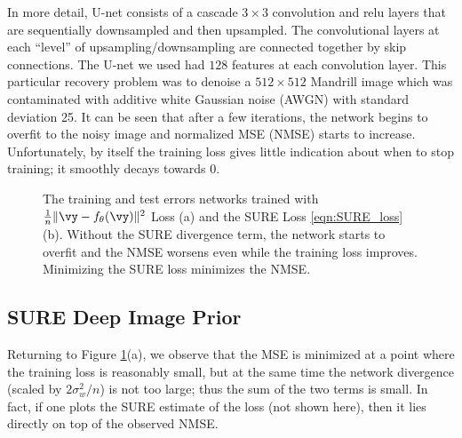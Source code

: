 \documentclass{article}
\begin{document}
In more detail, U-net \cite{Unet} consists of a cascade $3\times 3$ convolution and relu layers that are sequentially downsampled and then upsampled. The convolutional layers at each ``level'' of upsampling/downsampling are connected together by skip connections. The U-net we used had $128$ features at each convolution layer.
This particular recovery problem was to denoise a $512\times 512$ Mandrill image which was contaminated with additive white Gaussian noise (AWGN) with standard deviation 25.
It can be seen that after a few iterations, the network begins to overfit to the noisy image and normalized MSE (NMSE) starts to increase. 
Unfortunately, by itself the training loss gives little indication about when to stop training; it smoothly decays towards $0$.

\begin{figure}[t]
\centering
{}
\caption{ The training and test errors networks trained with $\frac{1}{n}\|\vy-f_\theta(\vy)\|^2$ Loss (a) and the SURE Loss \eqref{eqn:SURE_loss} (b). Without the SURE divergence term, the network starts to overfit and the NMSE worsens even while the training loss improves. Minimizing the SURE loss minimizes the NMSE.}
\label{fig:ReconErrs}
\end{figure}\subsection{SURE Deep Image Prior}

Returning to Figure \ref{fig:ReconErrs}(a), we observe that the MSE is minimized at a point where  the training loss is reasonably small, but at the same time the network divergence (scaled by $2\sigma_w^2/n$) is not too large; thus the sum of the two terms is small. 
In fact, if one plots the SURE estimate of the loss (not shown here), then it lies directly on top of the observed NMSE.
\end{document}
